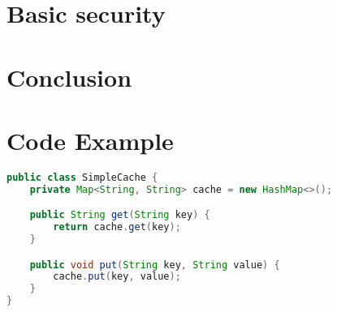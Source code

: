 \documentclass[a4paper, 11pt]{book}
\begin{document}
    \lipsum[7]

    \section{Basic security}
    \lipsum[7]

    \section{Conclusion}
    \lipsum[7]

    \newpage



    \section{Code Example}
    \begin{lstlisting}[language=Java, caption=Java Code for a Simple Cache]
public class SimpleCache {
    private Map<String, String> cache = new HashMap<>();

    public String get(String key) {
        return cache.get(key);
    }

    public void put(String key, String value) {
        cache.put(key, value);
    }
}
    \end{lstlisting}
\end{document}
